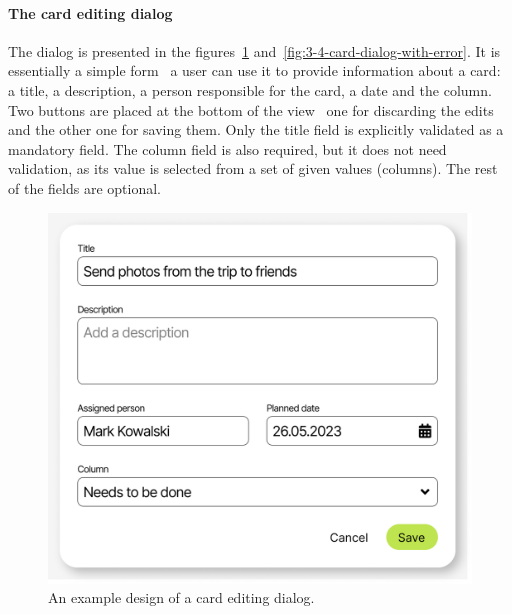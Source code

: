 \paragraph{The card editing dialog}
The dialog is presented in the figures~\ref{fig:3-4-card-dialog} and~\ref{fig:3-4-card-dialog-with-error}.
It is essentially a simple form \textendash\ a user can use it to provide information about a card: a title, a description, a person responsible for the card, a date and the column.
Two buttons are placed at the bottom of the view \textendash\ one for discarding the edits and the other one for saving them.
Only the title field is explicitly validated as a mandatory field.
The column field is also required, but it does not need validation, as its value is selected from a set of given values (columns).
The rest of the fields are optional.

\begin{figure}
    \centering
    \includegraphics[height=0.4\textheight]{./3-research-methodology/card-dialog}
    \caption{An example design of a card editing dialog.}
    \label{fig:3-4-card-dialog}
\end{figure}

